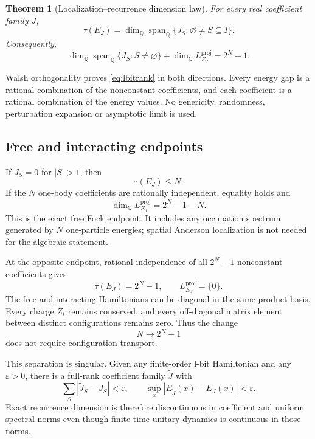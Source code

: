 \documentclass[10pt]{article}
\newtheorem{theorem}{Theorem}
\theoremstyle{definition}
\newcommand{\Q}{\mathbb Q}
\newcommand{\spanQ}{\operatorname{span}_{\Q}}
\begin{document}
\begin{theorem}[Localization--recurrence dimension law]
For every real coefficient family \(J\),
\begin{equation}
 \boxed{
 \tau(E_J)=
 \dim_{\Q}\spanQ\{J_S:\varnothing\ne S\subseteq I\}.}
 \label{eq:lbitrank}
\end{equation}
Consequently,
\begin{equation}
 \boxed{
 \dim_{\Q}\spanQ\{J_S:S\ne\varnothing\}
 +\dim_{\Q}L_{E_J}^{\mathrm{proj}}
 =2^N-1.}
 \label{eq:lbitbudget}
\end{equation}
\end{theorem}

Walsh orthogonality proves \eqref{eq:lbitrank} in both directions. Every
energy gap is a rational combination of the nonconstant coefficients, and
each coefficient is a rational combination of the energy values. No
genericity, randomness, perturbation expansion or asymptotic limit is used.

\subsection{Free and interacting endpoints}

If \(J_S=0\) for \(|S|>1\), then
\begin{equation}
 \tau(E_J)\le N.
 \label{eq:freebound}
\end{equation}
If the \(N\) one-body coefficients are rationally independent, equality
holds and
\begin{equation}
 \dim_{\Q}L_{E_J}^{\mathrm{proj}}=2^N-1-N.
 \label{eq:freerelations}
\end{equation}
This is the exact free Fock endpoint. It includes any occupation spectrum
generated by \(N\) one-particle energies; spatial Anderson localization is
not needed for the algebraic statement.

At the opposite endpoint, rational independence of all
\(2^N-1\) nonconstant coefficients gives
\begin{equation}
 \tau(E_J)=2^N-1,\qquad
 L_{E_J}^{\mathrm{proj}}=\{0\}.
 \label{eq:fullrank}
\end{equation}
The free and interacting Hamiltonians can be diagonal in the same product
basis. Every charge \(Z_i\) remains conserved, and every off-diagonal matrix
element between distinct configurations remains zero. Thus the change
\[
 N\longrightarrow 2^N-1
\]
does not require configuration transport.

This separation is singular. Given any finite-order l-bit Hamiltonian and
any \(\varepsilon>0\), there is a full-rank coefficient family
\(\widetilde J\) with
\begin{equation}
 \sum_S|\widetilde J_S-J_S|<\varepsilon,\qquad
 \sup_x|E_{\widetilde J}(x)-E_J(x)|<\varepsilon.
 \label{eq:weak}
\end{equation}
Exact recurrence dimension is therefore discontinuous in coefficient and
uniform spectral norms even though finite-time unitary dynamics is
continuous in those norms.
\end{document}
